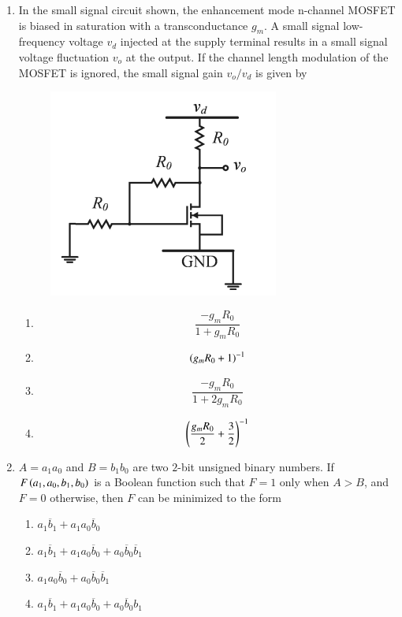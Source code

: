 \documentclass[journal,12pt,onecolumn]{IEEEtran}
\theoremstyle{remark}
\begin{document}
\begin{enumerate}
\item In the small signal circuit shown, the enhancement mode n-channel MOSFET is biased in saturation with a transconductance $g_m$. A small signal low-frequency voltage $v_d$ injected at the supply terminal results in a small signal voltage fluctuation $v_o$ at the output. If the channel length modulation of the MOSFET is ignored, the small signal gain $v_o/v_d$ is given by \underline{\hspace{2cm}}

\hfill{}
\begin{figure}[H]
\includegraphics[width = 0.3\columnwidth]{q47}
\caption*{}
\label{q47}
\end{figure}
\begin{enumerate}
\item $$\frac{-g_m R_0}{1 + g_m R_0}$$
\item $$\left(g_m R_0 + 1\right)^{-1}$$
\item $$\frac{-g_m R_0}{1 + 2g_m R_0}$$
\item $$\left(\frac{g_m R_0}{2} + \frac{3}{2}\right)^{-1}$$
\end{enumerate}

\item $A = a_1 a_0$ and $B = b_1 b_0$ are two $2$-bit unsigned binary numbers. If $F\left(a_1, a_0, b_1, b_0\right)$ is a Boolean function such that $F = 1$ only when $A > B$, and $F = 0$ otherwise, then $F$ can be minimized to the form \underline{\hspace{2cm}}

\hfill{}
\begin{enumerate}
\item $a_1 \overline{b}_1 + a_1 a_0 \overline{b}_0$
\item $a_1 \overline{b}_1 + a_1 a_0 \overline{b}_0 + a_0 \overline{b}_0 \overline{b}_1$
\item $a_1 a_0 \overline{b}_0 + a_0 \overline{b}_0 \overline{b}_1$
\item $a_1 \overline{b}_1 + a_1 a_0 \overline{b}_0 + a_0 \overline{b}_0 b_1$
\end{enumerate}


\end{enumerate}
\end{document}
